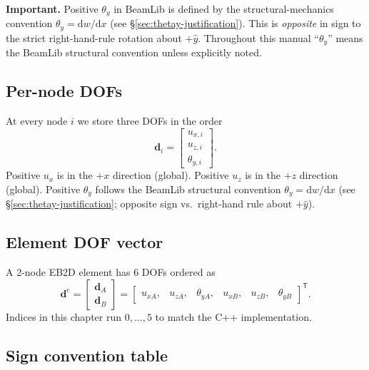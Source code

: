 \documentclass[11pt,a4paper]{article}
\newcommand{\bmath}[1]{\boldsymbol{#1}}
\begin{document}
\textbf{Important.} Positive $\theta_y$ in BeamLib is defined by the structural-mechanics convention $\theta_y = \mathrm{d}w/\mathrm{d}x$ (see \S\ref{sec:thetay-justification}). This is \emph{opposite} in sign to the strict right-hand-rule rotation about $+\hat{y}$. Throughout this manual ``$\theta_y$'' means the BeamLib structural convention unless explicitly noted.

\subsection{Per-node DOFs}

At every node $i$ we store three DOFs in the order
\[
\bmath{d}_i = \begin{bmatrix} u_{x,i} \\ u_{z,i} \\ \theta_{y,i} \end{bmatrix}.
\]
Positive $u_x$ is in the $+x$ direction (global). Positive $u_z$ is in the $+z$ direction (global). Positive $\theta_y$ follows the BeamLib structural convention $\theta_y = \mathrm{d}w/\mathrm{d}x$ (see \S\ref{sec:thetay-justification}; opposite sign vs.\ right-hand rule about $+\hat{y}$).

\subsection{Element DOF vector}

A 2-node EB2D element has 6 DOFs ordered as
\[
\bmath{d}^e = \begin{bmatrix} \bmath{d}_A \\ \bmath{d}_B \end{bmatrix} = \begin{bmatrix} u_{xA}, & u_{zA}, & \theta_{yA}, & u_{xB}, & u_{zB}, & \theta_{yB} \end{bmatrix}^\mathsf{T}.
\]
Indices in this chapter run $0,\dots,5$ to match the C++ implementation.

\subsection{Sign convention table}
\end{document}
